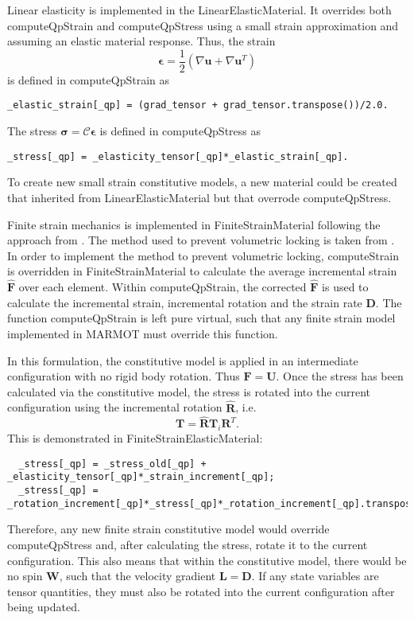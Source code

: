 \documentclass[letter,12pt,fleqn]{article}
\begin{document}
Linear elasticity is implemented in the LinearElasticMaterial. It overrides both computeQpStrain and computeQpStress using a small strain approximation and assuming an elastic material response. Thus, the strain 
\begin{equation}
  \boldsymbol{\epsilon} = \frac{1}{2} (\nabla \mathbf{u} + \nabla \mathbf{u}^T)
\end{equation}
is defined in computeQpStrain as 
{\scriptsize \begin{verbatim}
_elastic_strain[_qp] = (grad_tensor + grad_tensor.transpose())/2.0.
\end{verbatim}}

The stress $\boldsymbol{\sigma} = \boldsymbol{\mathcal{C}} \boldsymbol{\epsilon}$ is defined in computeQpStress as
{\scriptsize \begin{verbatim}
_stress[_qp] = _elasticity_tensor[_qp]*_elastic_strain[_qp].
\end{verbatim}}
To create new small strain constitutive models, a new material could be created that inherited from LinearElasticMaterial but that overrode computeQpStress.

Finite strain mechanics is implemented in FiniteStrainMaterial following the approach from \citet{rashid1993}. The method used to prevent volumetric locking is taken from \citet{rashid_notes}. In order to implement the method to prevent volumetric locking, computeStrain is overridden in FiniteStrainMaterial to calculate the average incremental strain $\hat{\mathbf{F}}$ over each element. Within computeQpStrain, the corrected $\hat{\mathbf{F}}$ is used to calculate the incremental strain, incremental rotation and the strain rate $\mathbf{D}$. The function computeQpStrain is left pure virtual, such that any finite strain model implemented in MARMOT must override this function.

In this formulation, the constitutive model is applied in an intermediate configuration with no rigid body rotation. Thus $\mathbf{F} = \mathbf{U}$. Once the stress has been calculated via the constitutive model, the stress is rotated into the current configuration using the incremental rotation $\hat{\mathbf{R}}$, i.e. 
\begin{equation}
  \mathbf{T} = \hat{\mathbf{R}} \mathbf{T}_i \mathbf{R}^T.
\end{equation}
This is demonstrated in FiniteStrainElasticMaterial:
{\scriptsize \begin{verbatim}
  _stress[_qp] = _stress_old[_qp] + _elasticity_tensor[_qp]*_strain_increment[_qp]; 
  _stress[_qp] = _rotation_increment[_qp]*_stress[_qp]*_rotation_increment[_qp].transpose();
\end{verbatim}}
Therefore, any new finite strain constitutive model would override computeQpStress and, after calculating the stress, rotate it to the current configuration. This also means that within the constitutive model, there would be no spin $\mathbf{W}$, such that the velocity gradient $\mathbf{L} = \mathbf{D}$. If any state variables are tensor quantities, they must also be rotated into the current configuration after being updated.
\end{document}
